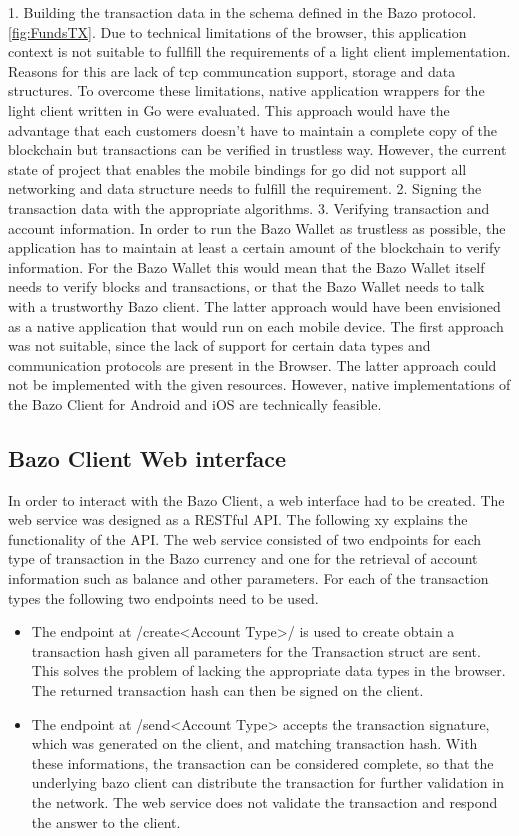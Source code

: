 1. Building the transaction data in the schema defined in the Bazo protocol. \ref{fig:FundsTX}.
Due to technical limitations of the browser, this application context is not suitable to fullfill the requirements of a light client implementation. Reasons for this are lack of tcp communcation support, storage and data structures.
To overcome these limitations, native application wrappers for the light client written in Go were evaluated. This approach would have the advantage that each customers doesn't have to maintain a complete copy of the blockchain but transactions can be verified in trustless way. However, the current state of project that enables the mobile bindings for go did not support all networking and data structure needs to fulfill the requirement. \cite{gobind}
2. Signing the transaction data with the appropriate algorithms.
3. Verifying transaction and account information.
In order to run the Bazo Wallet as trustless as possible, the application has to maintain at least a certain amount of the blockchain to verify information. For the Bazo Wallet this would mean that the Bazo Wallet itself needs to verify blocks and transactions, or that the Bazo Wallet needs to talk with a trustworthy Bazo client. The latter approach would have been envisioned as a native application that would run on each mobile device.
The first approach was not suitable, since the lack of support for certain data types and communication protocols are present in the Browser. The latter approach could not be implemented with the given resources. However, native implementations of the Bazo Client for Android and iOS are technically feasible.



\subsection{Bazo Client Web interface} \label{bazoclientwebinterface}
In order to interact with the Bazo Client, a web interface had to be created. The web service was designed as a RESTful API. The following xy explains the functionality of the API.
The web service consisted of two endpoints for each type of transaction in the Bazo currency and one for the retrieval of account information such as balance and other parameters.
For each of the transaction types the following two endpoints need to be used.
\begin{itemize}
\item The endpoint at /create<Account Type>/ is used to create obtain a transaction hash given all parameters for the Transaction struct are sent. This solves the problem of lacking the appropriate data types in the browser. The  returned transaction hash can then be signed on the client.
\item The endpoint at /send<Account Type> accepts the transaction signature, which was generated on the client, and matching transaction hash. With these informations, the transaction can be considered complete, so that the underlying bazo client can distribute the transaction for further validation in the network. The web service does not validate the transaction and respond the answer to the client.
\end{itemize}  

